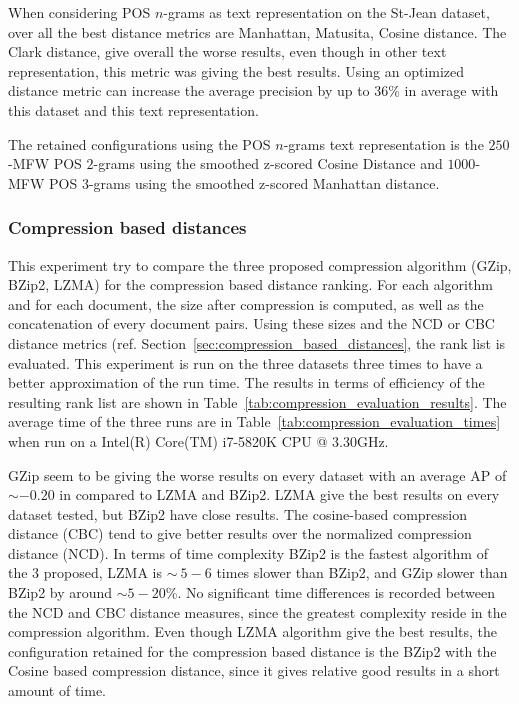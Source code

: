 When considering POS $n$-grams as text representation on the St-Jean dataset, over all the best distance metrics are Manhattan, Matusita, Cosine distance.
The Clark distance, give overall the worse results, even though in other text representation, this metric was giving the best results.
Using an optimized distance metric can increase the average precision by up to $36$\% in average with this dataset and this text representation.

The retained configurations using the POS $n$-grams text representation is the $250$-MFW POS $2$-grams using the smoothed z-scored Cosine Distance and $1000$-MFW POS $3$-grams using the smoothed z-scored Manhattan distance.

\subsubsection{Compression based distances}

This experiment try to compare the three proposed compression algorithm (GZip, BZip2, LZMA) for the compression based distance ranking.
For each algorithm and for each document, the size after compression is computed, as well as the concatenation of every document pairs.
Using these sizes and the NCD or CBC distance metrics (ref. Section~\ref{sec:compression_based_distances}, the rank list is evaluated.
This experiment is run on the three datasets three times to have a better approximation of the run time.
The results in terms of efficiency of the resulting rank list are shown in Table~\ref{tab:compression_evaluation_results}.
The average time of the three runs are in Table~\ref{tab:compression_evaluation_times} when run on a Intel(R) Core(TM) i7-5820K CPU @ 3.30GHz.

GZip seem to be giving the worse results on every dataset with an average AP of $\sim -0.20$ in compared to LZMA and BZip2.
LZMA give the best results on every dataset tested, but BZip2 have close results.
The cosine-based compression distance (CBC) tend to give better results over the normalized compression distance (NCD).
In terms of time complexity BZip2 is the fastest algorithm of the 3 proposed, LZMA is $\sim ~5-6$ times slower than BZip2, and GZip slower than BZip2 by around $\sim 5-20$\%.
No significant time differences is recorded between the NCD and CBC distance measures, since the greatest complexity reside in the compression algorithm.
Even though LZMA algorithm give the best results, the configuration retained for the compression based distance is the BZip2 with the Cosine based compression distance, since it gives relative good results in a short amount of time.

